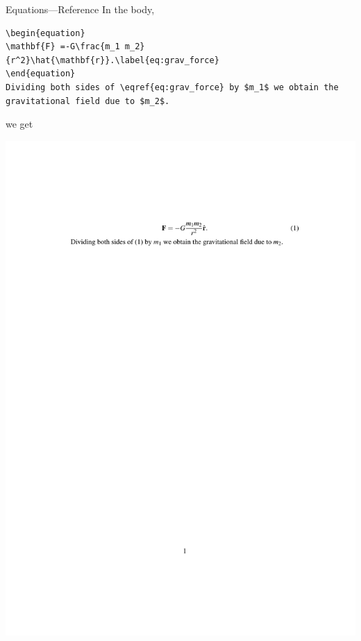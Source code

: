 \documentclass[12pt]{gshs_lecture}
\begin{document}
\begin{frame}[t,fragile]{Equations---Reference}\small
In the body,
\begin{block}{}
\begin{lstlisting}
\begin{equation}
\mathbf{F} =-G\frac{m_1 m_2}{r^2}\hat{\mathbf{r}}.\label{eq:grav_force}
\end{equation}
Dividing both sides of \eqref{eq:grav_force} by $m_1$ we obtain the gravitational field due to $m_2$.
\end{lstlisting}
\end{block}
we get
\begin{center}
\begin{framed}
\includegraphics[width=\textwidth,trim={0cm 21.5cm 0cm 4cm},clip]{./test_article/article012.pdf}
\end{framed}
\end{center}
\end{frame}
\end{document}
